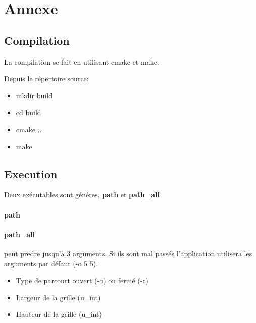 \section{Annexe}
\subsection{Compilation}
La compilation se fait en utilisant cmake et make.

Depuis le répertoire source:
\begin{itemize}
\item mkdir build
\item cd build
\item cmake ..
\item make
\end{itemize}
\subsection{Execution}
Deux exécutables sont généres, \textbf{path} et \textbf{path_all}

\paragraph{path}
\paragraph{path_all} peut predre jusqu'à 3 arguments. Si ils sont mal passés l'application utilisera les arguments par défaut (-o 5 5).
\begin{itemize}
\item Type de parcourt ouvert (-o) ou fermé (-c)
\item Largeur de la grille (u_int)
\item Hauteur de la grille (u_int)
\end{itemize}
